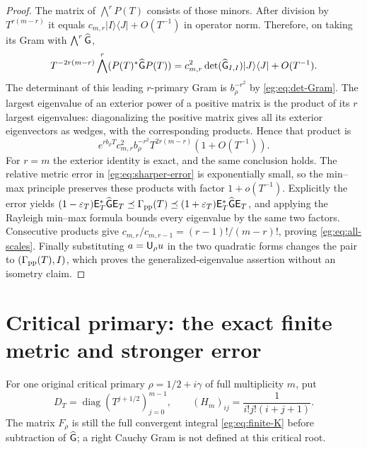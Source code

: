 \documentclass[11pt]{article}
\begin{document}
\begin{proof}
The matrix of $\bigwedge^rP(T)$ consists of those minors. After
division by $T^{r(m-r)}$ it equals
$c_{m,r}|I\rangle\langle J|+O(T^{-1})$ in operator norm.
Therefore, on taking its Gram with $\bigwedge^r\widehat{\mathsf G}$,
\[
 T^{-2r(m-r)}\bigwedge^r(P(T)^*\widehat{\mathsf G} P(T))
 =c_{m,r}^2\det(\widehat{\mathsf G}_{I,I})|J\rangle\langle J|+O(T^{-1}).
\]
The determinant of this leading $r$-primary Gram is $b_\rho^{-r^2}$
by \eqref{eg:eq:det-Gram}. The largest eigenvalue of an exterior power
of a positive matrix is the product of its $r$ largest eigenvalues:
diagonalizing the positive matrix gives all its exterior eigenvectors
as wedges, with the corresponding products. Hence that product is
\[
 e^{rb_\rho T}c_{m,r}^2b_\rho^{-r^2}T^{2r(m-r)}(1+O(T^{-1})).
\]
For $r=m$ the exterior identity is exact, and the same conclusion
holds. The relative metric error in \eqref{eg:eq:sharper-error} is
exponentially small, so the min--max principle preserves these
products with factor $1+o(T^{-1})$. Explicitly the error yields
$(1-\varepsilon_T)\mathsf E_T^*\widehat{\mathsf G}\mathsf E_T\preceq\Gamma_{\rm pp}(T)
\preceq(1+\varepsilon_T)\mathsf E_T^*\widehat{\mathsf G}\mathsf E_T$, and applying
the Rayleigh min--max formula bounds every eigenvalue by the same
two factors. Consecutive products give
$c_{m,r}/c_{m,r-1}=(r-1)!/(m-r)!$, proving \eqref{eg:eq:all-scales}.
Finally substituting $a=\mathsf U_\rho u$ in the two quadratic forms
changes the pair to $(\Gamma_{\rm pp}(T),I)$, which proves the
generalized-eigenvalue assertion without an isometry claim.
\end{proof}

\section{Critical primary: the exact finite metric and stronger error}\label{eg:sec:critical}
For one original critical primary $\rho=1/2+i\gamma$ of full
multiplicity $m$, put
\[
 D_T=\operatorname{diag}(T^{j+1/2})_{j=0}^{m-1},\qquad
 (H_m)_{ij}=\frac1{i!j!(i+j+1)}.
 \tag{EG44}\label{eg:eq:critical-H}
\]
The matrix $F_\rho$ is still the full convergent integral
\eqref{eg:eq:finite-K} before subtraction of $\widehat{\mathsf G}$; a right
Cauchy Gram is not defined at this critical root.
\end{document}
